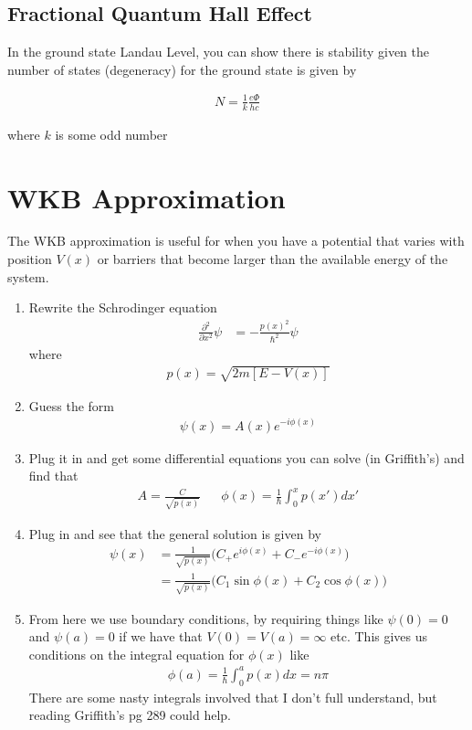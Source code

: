 
\subsection{Fractional Quantum Hall Effect}
In the ground state Landau Level, you can show there is stability given the number of states (degeneracy) for the ground state is given by

\begin{align}
N = \frac{1}{k}\frac{e\Phi}{hc}
\end{align}

where $k$ is some odd number




\section{WKB Approximation}
The WKB approximation is useful for when you have a potential that varies with position $V(x)$ or barriers that become larger than the available energy of the system. 
\begin{enumerate}
\item Rewrite the Schrodinger equation
\begin{align}
\frac{\partial^2}{\partial x^2}\psi &= -\frac{p(x)^2}{\hbar^2}\psi
\end{align}
where
\begin{align}
p(x) = \sqrt{2m[E-V(x)]}
\end{align}
\item Guess the form
\begin{align}
\psi(x) = A(x)e^{-i\phi(x)}
\end{align}
\item Plug it in and get some differential equations you can solve (in Griffith's) and find that
\begin{align}
A = \frac{C}{\sqrt{p(x)}} && \phi(x) = \frac{1}{\hbar}\int_0^x p(x') dx'
\end{align}


\item Plug in and see that the general solution is given by
\begin{align}
\psi(x) &= \frac{1}{\sqrt{p(x)}}\Big(C_+e^{i\phi(x)} + C_-e^{-i\phi(x)}\Big)\\
&= \frac{1}{\sqrt{p(x)}}\Big(C_1\sin\phi(x) + C_2\cos\phi(x)\Big)
\end{align}

\item From here we use boundary conditions, by requiring things like $\psi(0) = 0$ and $\psi(a) = 0$ if we have that $V(0) = V(a) = \infty$ etc. This gives us conditions on the integral equation for $\phi(x)$ like
\begin{align}
\phi(a) = \frac{1}{\hbar}\int_0^a p(x) dx = n\pi
\end{align}
There are some nasty integrals involved that I don't full understand, but reading Griffith's pg 289 could help.

\end{enumerate}

